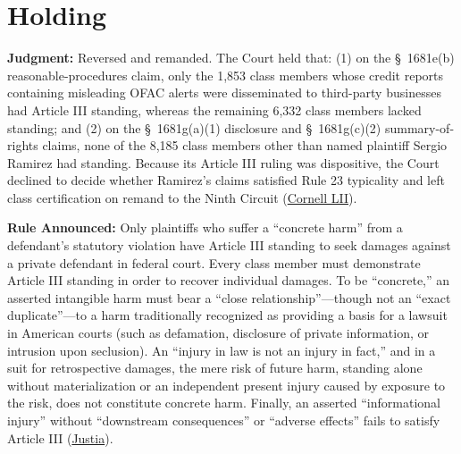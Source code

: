 \documentclass[12pt]{article}
\begin{document}
\section{Holding}

\textbf{Judgment:} Reversed and remanded. The Court held that: (1) on the \S~1681e(b) reasonable-procedures claim, only the 1,853 class members whose credit reports containing misleading OFAC alerts were disseminated to third-party businesses had Article III standing, whereas the remaining 6,332 class members lacked standing; and (2) on the \S~1681g(a)(1) disclosure and \S~1681g(c)(2) summary-of-rights claims, none of the 8,185 class members other than named plaintiff Sergio Ramirez had standing. Because its Article III ruling was dispositive, the Court declined to decide whether Ramirez's claims satisfied Rule 23 typicality and left class certification on remand to the Ninth Circuit (\href{https://www.law.cornell.edu/supremecourt/text/20-297}{Cornell LII}).

\textbf{Rule Announced:} Only plaintiffs who suffer a ``concrete harm'' from a defendant's statutory violation have Article III standing to seek damages against a private defendant in federal court. Every class member must demonstrate Article III standing in order to recover individual damages. To be ``concrete,'' an asserted intangible harm must bear a ``close relationship''---though not an ``exact duplicate''---to a harm traditionally recognized as providing a basis for a lawsuit in American courts (such as defamation, disclosure of private information, or intrusion upon seclusion). An ``injury in law is not an injury in fact,'' and in a suit for retrospective damages, the mere risk of future harm, standing alone without materialization or an independent present injury caused by exposure to the risk, does not constitute concrete harm. Finally, an asserted ``informational injury'' without ``downstream consequences'' or ``adverse effects'' fails to satisfy Article III (\href{https://supreme.justia.com/cases/federal/us/594/20-297/}{Justia}).
\end{document}

